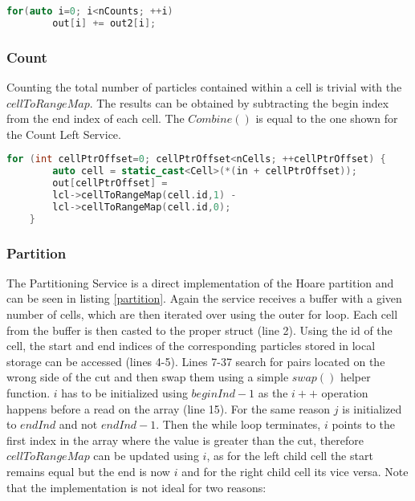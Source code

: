 \documentclass[]{article}
\begin{document}
\begin{lstlisting}[language=c++, caption=Part of the Count Left Combine() method, label=ctlc]
	for(auto i=0; i<nCounts; ++i)
		out[i] += out2[i];
\end{lstlisting}

\subsubsection{Count}

Counting the total number of particles contained within a cell is trivial with the $cellToRangeMap$. The results can be obtained by subtracting the begin index from the end index of each cell. The $Combine()$ is equal to the one shown for the Count Left Service.

\begin{lstlisting}[language=c++, caption=Part of Count Service() method]
	for (int cellPtrOffset=0; cellPtrOffset<nCells; ++cellPtrOffset) {
		auto cell = static_cast<Cell>(*(in + cellPtrOffset));
		out[cellPtrOffset] = 
		lcl->cellToRangeMap(cell.id,1) - 
		lcl->cellToRangeMap(cell.id,0);
	}
\end{lstlisting}

\subsubsection{Partition}

The Partitioning Service is a direct implementation of the Hoare partition and can be seen in listing \ref{partition}. Again the service receives a buffer with a given number of cells, which are then iterated over using the outer for loop. Each cell from the buffer is then casted to the proper struct (line 2). Using the id of the cell, the start and end indices of the corresponding particles stored in local storage can be accessed (lines 4-5). Lines 7-37 search for pairs located on the wrong side of the cut and then swap them using a simple $swap()$ helper function. $i$ has to be initialized using $beginInd -1$ as the $i++$ operation happens before a read on the array (line 15). For the same reason $j$ is initialized to $endInd$ and not $endInd -1$. Then the while loop terminates, $i$ points to the first index in the array where the value is greater than the cut, therefore $cellToRangeMap$ can be updated using $i$, as for the left child cell the start remains equal but the end is now $i$ and for the right child cell its vice versa. 
Note that the implementation is not ideal for two reasons:
\end{document}
